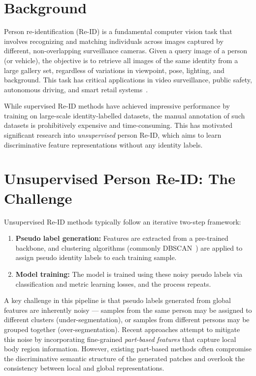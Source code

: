 
\section{Background}

Person re-identification (Re-ID) is a fundamental computer vision task that involves recognizing and matching individuals across images captured by different, non-overlapping surveillance cameras. Given a query image of a person (or vehicle), the objective is to retrieve all images of the same identity from a large gallery set, regardless of variations in viewpoint, pose, lighting, and background. This task has critical applications in video surveillance, public safety, autonomous driving, and smart retail systems~\cite{zheng2015scalable}.

While supervised Re-ID methods have achieved impressive performance by training on large-scale identity-labelled datasets, the manual annotation of such datasets is prohibitively expensive and time-consuming. This has motivated significant research into \textit{unsupervised} person Re-ID, which aims to learn discriminative feature representations without any identity labels.

\section{Unsupervised Person Re-ID: The Challenge}

Unsupervised Re-ID methods typically follow an iterative two-step framework:
\begin{enumerate}
    \item \textbf{Pseudo label generation:} Features are extracted from a pre-trained backbone, and clustering algorithms (commonly DBSCAN~\cite{ester1996dbscan}) are applied to assign pseudo identity labels to each training sample.
    \item \textbf{Model training:} The model is trained using these noisy pseudo labels via classification and metric learning losses, and the process repeats.
\end{enumerate}

A key challenge in this pipeline is that pseudo labels generated from global features are inherently noisy --- samples from the same person may be assigned to different clusters (under-segmentation), or samples from different persons may be grouped together (over-segmentation). Recent approaches attempt to mitigate this noise by incorporating fine-grained \textit{part-based features} that capture local body region information. However, existing part-based methods often compromise the discriminative semantic structure of the generated patches and overlook the consistency between local and global representations.

